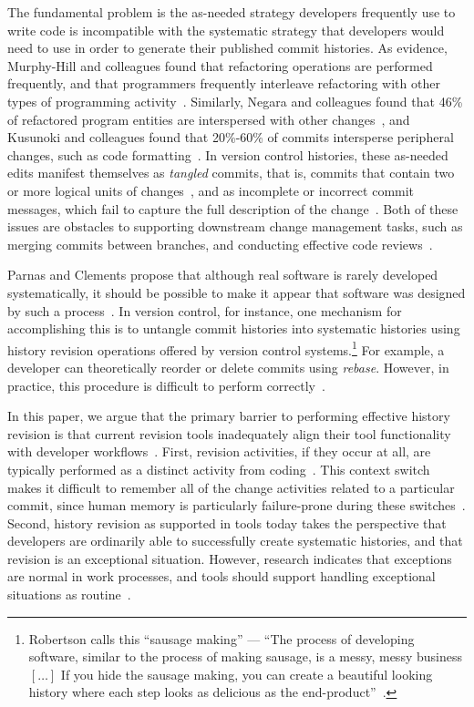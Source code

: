 \documentclass[conference]{IEEEtran}
\newcommand{\purpose}[1]{}
\begin{document}
\purpose{Problem is that strategies are incompatible.} 
The fundamental problem is the as-needed strategy developers frequently use to write code is incompatible with 
the systematic strategy that developers would need to use in order to generate their published commit histories. 
As evidence, Murphy-Hill and colleagues found that refactoring operations are performed frequently, and that programmers 
frequently interleave refactoring with other types of programming activity~\cite{Murphy-Hill2012c}. 
%
Similarly, Negara and colleagues found that 46\% of refactored program entities are interspersed with other changes~\cite{Negara2012}, and Kusunoki and colleagues found that 20\%-60\% of commits intersperse peripheral changes, such as code formatting~\cite{Kusunoki2013}.
% 
In version control histories, these as-needed edits manifest themselves as \emph{tangled} commits, that is, commits that contain two or more logical units of changes~\cite{Kirinuki2014}, and as incomplete or incorrect commit messages, which fail to capture the full description of the change~\cite{Buse2010,Murphy-Hill2012c}. 
Both of these issues are obstacles to supporting downstream change management tasks, such as merging commits between branches, and conducting effective code reviews~\cite{Kirinuki2014}.

\purpose{History revision gets out of this conflict} 
Parnas and Clements propose that although real software is rarely developed systematically, it should be possible to make it appear that software was designed by such a process~\cite{Parnas1986}. In version control, for instance, one mechanism for accomplishing this is to untangle commit histories into systematic histories using history revision operations offered by version control systems.\footnote{Robertson calls this ``sausage making'' --- ``The process of developing software, 
similar to the process of making sausage, is a messy, messy business $[\ldots]$ If you hide the sausage making, 
you can create a beautiful looking history where each step looks as delicious as the end-product''~\cite{SausageMaking}.} 
For example, a developer can theoretically reorder or delete commits using \textit{rebase}.
However, in practice, this procedure is difficult to perform correctly~\cite{SausageMaking}.

\purpose{History revisions are not properly supported by tools} 
In this paper, we argue that the primary barrier to performing effective history revision is that current revision tools inadequately align their tool 
functionality with developer workflows~\cite{PerezDeRosso2013}.
First, revision activities, if they occur at all, are typically performed as a distinct activity from coding~\cite{Perry1989}. 
This context switch makes it difficult to remember all of the change activities related to a particular commit, 
since human memory is particularly failure-prone during these switches~\cite{Parnin2012}. 
Second, history revision as supported in tools today takes the perspective that 
developers are ordinarily able to successfully create systematic histories, and that revision is an exceptional situation. However, research indicates that exceptions are normal in work processes, and tools should support handling 
exceptional situations as routine~\cite{Ackerman2000}.
\end{document}
